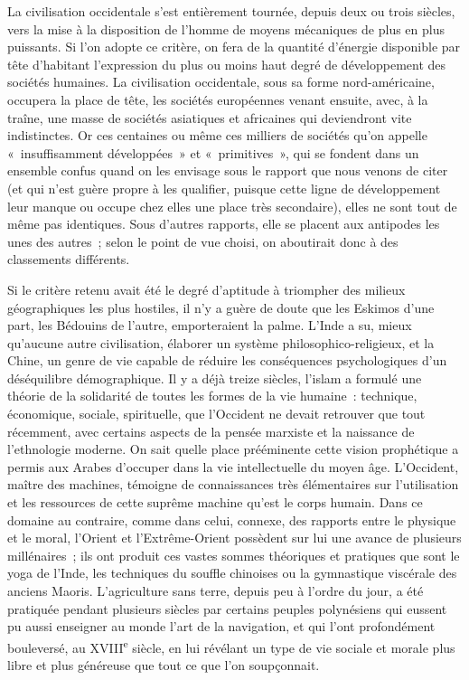 \documentclass[french,twoside]{book} %
\begin{document}
La civilisation occidentale s’est entièrement tournée, depuis deux ou trois siècles, vers la mise à la disposition de l’homme de moyens mécaniques de plus en plus puissants. Si l’on adopte ce critère, on fera de la quantité d’énergie disponible par tête d’habitant l’expression du plus ou moins haut degré de développement des sociétés humaines. La civilisation occidentale, sous sa forme nord-américaine, occupera la place de tête, les sociétés européennes venant ensuite, avec, à la traîne, une masse de sociétés asiatiques et africaines qui deviendront vite indistinctes. Or ces centaines ou même ces milliers de sociétés qu’on appelle « insuffisamment développées » et « primitives », qui se fondent dans un ensemble confus quand on les envisage sous le rapport que nous venons de citer (et qui n’est guère propre à les qualifier, puisque cette ligne de développement leur manque ou occupe chez elles une place très secondaire), elles ne sont tout de même pas identiques. Sous d’autres rapports, elle se placent aux antipodes les unes des autres ; selon le point de vue choisi, on aboutirait donc à des classements différents.\par
Si le critère retenu avait été le degré d’aptitude à triompher des milieux géographiques les plus hostiles, il n’y a guère de doute que les Eskimos d’une part, les Bédouins de l’autre, emporteraient la palme. L’Inde a su, mieux qu’aucune autre civilisation, élaborer un système philosophico-religieux, et la Chine, un genre de vie capable de réduire les conséquences psychologiques d’un déséquilibre démographique. Il y a déjà treize siècles, l’islam a formulé une théorie de la solidarité de toutes les formes de la vie humaine : technique, économique, sociale, spirituelle, que l’Occident ne devait retrouver que tout récemment, avec certains aspects de la pensée marxiste et la naissance de l’ethnologie moderne. On sait quelle place prééminente cette vision prophétique a permis aux Arabes d’occuper dans la vie intellectuelle du moyen âge. L’Occident, maître des machines, témoigne de connaissances très élémentaires sur l’utilisation et les ressources de cette suprême machine qu’est le corps humain. Dans ce domaine au contraire, comme dans celui, connexe, des rapports entre le physique et le moral, l’Orient et l’Extrême-Orient possèdent sur lui une avance de plusieurs millénaires ; ils ont produit ces vastes sommes théoriques et pratiques que sont le yoga de l’Inde, les techniques du souffle chinoises ou la gymnastique viscérale des anciens Maoris. L’agriculture sans terre, depuis peu à l’ordre du jour, a été pratiquée pendant plusieurs siècles par certains peuples polynésiens qui eussent pu aussi enseigner au monde l’art de la navigation, et qui l’ont profondément bouleversé, au XVIII\textsuperscript{e} siècle, en lui révélant un type de vie sociale et morale plus libre et plus généreuse que tout ce que l’on soupçonnait.\par
\end{document}

